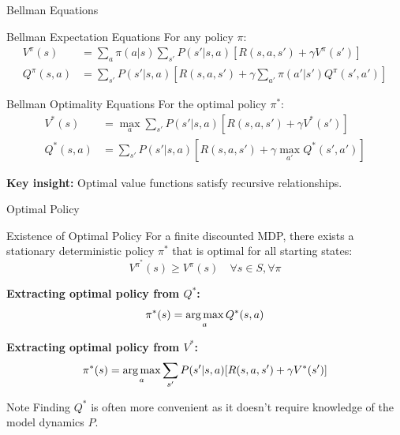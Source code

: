 \documentclass[aspectratio=169]{beamer}
\begin{document}
\begin{frame}{Bellman Equations}
  \begin{theorembox}{Bellman Expectation Equations}
    For any policy $\pi$:
    \begin{align*}
      V^\pi(s) &= \sum_a \pi(a|s) \sum_{s'} P(s'|s,a)[R(s,a,s') + \gamma V^\pi(s')] \\
      Q^\pi(s,a) &= \sum_{s'} P(s'|s,a)[R(s,a,s') + \gamma \sum_{a'} \pi(a'|s') Q^\pi(s',a')]
    \end{align*}
  \end{theorembox}

  \vspace{0.5em}

  \begin{theorembox}{Bellman Optimality Equations}
    For the optimal policy $\pi^*$:
    \begin{align*}
      V^*(s) &= \max_a \sum_{s'} P(s'|s,a)[R(s,a,s') + \gamma V^*(s')] \\
      Q^*(s,a) &= \sum_{s'} P(s'|s,a)[R(s,a,s') + \gamma \max_{a'} Q^*(s',a')]
    \end{align*}
  \end{theorembox}

  \textbf{Key insight:} Optimal value functions satisfy recursive relationships.
\end{frame}

\begin{frame}{Optimal Policy}
  \begin{theorembox}{Existence of Optimal Policy}
    For a finite discounted MDP, there exists a stationary deterministic policy $\pi^*$ that is optimal for all starting states:
    $$V^{\pi^*}(s) \geq V^\pi(s) \quad \forall s \in S, \forall \pi$$
  \end{theorembox}

  \vspace{0.5em}

  \textbf{Extracting optimal policy from $Q^*$:}
  $$\pi^*(s) = \operatorname*{arg\,max}_a Q^*(s,a)$$

  \vspace{0.5em}

  \textbf{Extracting optimal policy from $V^*$:}
  $$\pi^*(s) = \operatorname*{arg\,max}_a \sum_{s'} P(s'|s,a)[R(s,a,s') + \gamma V^*(s')]$$

  \vspace{0.5em}

  \begin{alertbox}{Note}
    Finding $Q^*$ is often more convenient as it doesn't require knowledge of the model dynamics $P$.
  \end{alertbox}
\end{frame}
\end{document}
